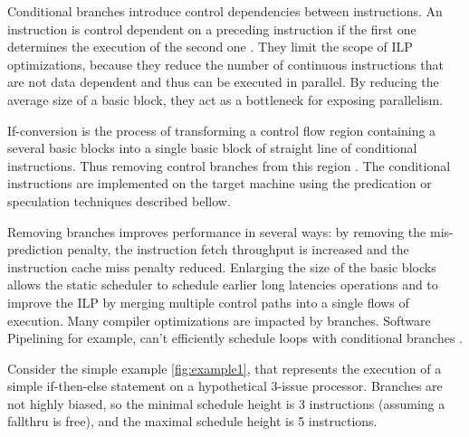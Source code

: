 Conditional branches introduce control dependencies between instructions. An instruction is control dependent on a preceding instruction if the first one determines the execution of the second one \cite{Kennedy:2001:OCM:502981}. They limit the scope of ILP optimizations, because they reduce the number of continuous instructions that are not data dependent and thus can be executed in parallel. By reducing the average size of a basic block, they act as a bottleneck for exposing parallelism.

If-conversion is the process of transforming a control flow region containing a several basic blocks into a single basic block of straight line of conditional instructions. Thus removing control branches from this region \cite{Schlansker97achievinghigh}. The conditional instructions are implemented on the target machine using the predication or speculation techniques described bellow. 

Removing branches improves performance in several ways: by removing the mis-prediction penalty, the instruction fetch throughput is increased and the instruction cache miss penalty reduced. Enlarging the size of the basic blocks allows the static scheduler to schedule earlier long latencies operations and to improve the ILP by merging multiple control paths into a single flows of execution. Many compiler optimizations are impacted by branches. Software Pipelining for example, can't efficiently schedule loops with conditional branches \cite{Warter:1992:EMS:144953.145796}.

Consider the simple example \ref{fig:example1}, that represents the execution of a simple if-then-else statement on a hypothetical 3-issue processor. Branches are not highly biased, so the minimal schedule height is 3 instructions (assuming a fallthru is free), and the maximal schedule height is 5 instructions.

